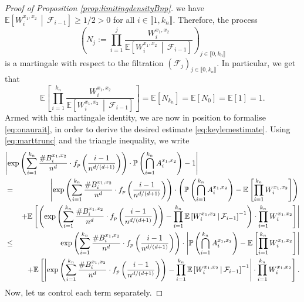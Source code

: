 \documentclass[a4paper,11pt]{article}
\begin{document}
\begin{proof}[Proof of Proposition \ref{prop:limitingdensityBnp}]
we have $\mathbb{E}\left[W_i^{x_1,x_2}\,\middle|\,\mathcal{F}_{i-1}\right]\geq1/2>0$ for all $i\in\llbracket1,k_n\rrbracket$.
Therefore, the process
\[\left(N_j:=\prod_{i=1}^j\frac{W_i^{x_1,x_2}}{\mathbb{E}\left[W_i^{x_1,x_2}\,\middle|\,\mathcal{F}_{i-1}\right]}\right)_{j\in\llbracket0,k_n\rrbracket}\]
is a martingale with respect to the filtration $\left(\mathcal{F}_j\right)_{j\in\llbracket0,k_n\rrbracket}$.
In particular, we get that
\begin{equation}\label{eq:marttrunc}
\mathbb{E}\left[\prod_{i=1}^{k_n}\frac{W_i^{x_1,x_2}}{\mathbb{E}\left[W_i^{x_1,x_2}\,\middle|\,\mathcal{F}_{i-1}\right]}\right]=\mathbb{E}\left[N_{k_n}\right]=\mathbb{E}[N_0]=\mathbb{E}[1]=1.
\end{equation}
Armed with this martingale identity, we are now in position to formalise \eqref{eq:onaurait}, in order to derive the desired estimate \eqref{eq:keylemestimate}.
Using \eqref{eq:marttrunc} and the triangle inequality, we write
\begin{eqnarray}
\lefteqn{\left|\exp\left(\sum_{i=1}^{k_n}\frac{\#B_i^{x_1,x_2}}{n^d}\cdot f_p\left(\frac{i-1}{n^{d/(d+1)}}\right)\right)\cdot\mathbb{P}\left(\bigcap_{i=1}^{k_n}A_i^{x_1,x_2}\right)-1\right|}\notag\\
&=&\left|\exp\left(\sum_{i=1}^{k_n}\frac{\#B_i^{x_1,x_2}}{n^d}\cdot f_p\left(\frac{i-1}{n^{d/(d+1)}}\right)\right)\cdot\left(\mathbb{P}\left(\bigcap_{i=1}^{k_n}A_i^{x_1,x_2}\right)- \mathbb{E} \left[ \prod_{i=1}^{k_n}W_i^{x_1,x_2} \right ]\right)\right.\notag\\
&&\left.+\mathbb{E}\left[\left(\exp\left(\sum_{i=1}^{k_n}\frac{\#B_i^{x_1,x_2}}{n^d}\cdot f_p\left(\frac{i-1}{n^{d/(d+1)}}\right)\right)-\prod_{i=1}^{k_n}\mathbb{E}\left[W_i^{x_1,x_2}\,\middle|\,\mathcal{F}_{i-1}\right]^{-1}\right)\cdot\prod_{i=1}^{k_n}W_i^{x_1,x_2}\right]\right|\notag \\
&\leq&\exp\left(\sum_{i=1}^{k_n}\frac{\#B_i^{x_1,x_2}}{n^d}\cdot f_p\left(\frac{i-1}{n^{d/(d+1)}}\right)\right)\cdot\left|\mathbb{P}\left(\bigcap_{i=1}^{k_n}A_i^{x_1,x_2}\right)-\mathbb{E}\left[\prod_{i=1}^{k_n}W_i^{x_1,x_2}\right]\right|\label{eq:lelem1stterm}\\
&&+\mathbb{E}\left[\left|\exp\left(\sum_{i=1}^{k_n}\frac{\#B_i^{x_1,x_2}}{n^d}\cdot f_p\left(\frac{i-1}{n^{d/(d+1)}}\right)\right)-\prod_{i=1}^{k_n}\mathbb{E}\left[W_i^{x_1,x_2}\,\middle|\,\mathcal{F}_{i-1}\right]^{-1}\right|\cdot\prod_{i=1}^{k_n}W_i^{x_1,x_2}\right].\label{eq:lelem2ndterm}
\end{eqnarray}
Now, let us control each term separately.

\end{proof}
\end{document}
